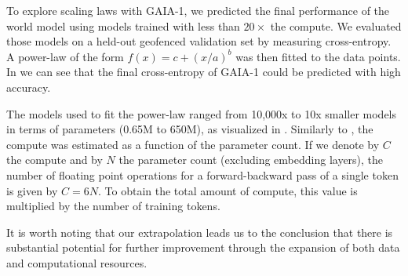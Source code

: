 To explore scaling laws with GAIA-1, we predicted the final performance of the world model using models trained with less than $20\times$ the compute. We evaluated those models on a held-out geofenced validation set by measuring cross-entropy. A power-law of the form $f(x) = c + (x/a)^b$ was then fitted to the data points. In  we can see that the final cross-entropy of GAIA-1 could be predicted with high accuracy.

The models used to fit the power-law ranged from 10,000x to 10x smaller models in terms of parameters (0.65M to 650M), as visualized in . Similarly to \citep{kaplan20}, the compute was estimated as a function of the parameter count. If we denote by $C$ the compute and by $N$ the parameter count (excluding embedding layers), the number of floating point operations for a forward-backward pass of a single token is given by $C=6N$. To obtain the total amount of compute, this value is multiplied by the number of training tokens.



It is worth noting that our extrapolation leads us to the conclusion that there is substantial potential for further improvement through the expansion of both data and computational resources.



